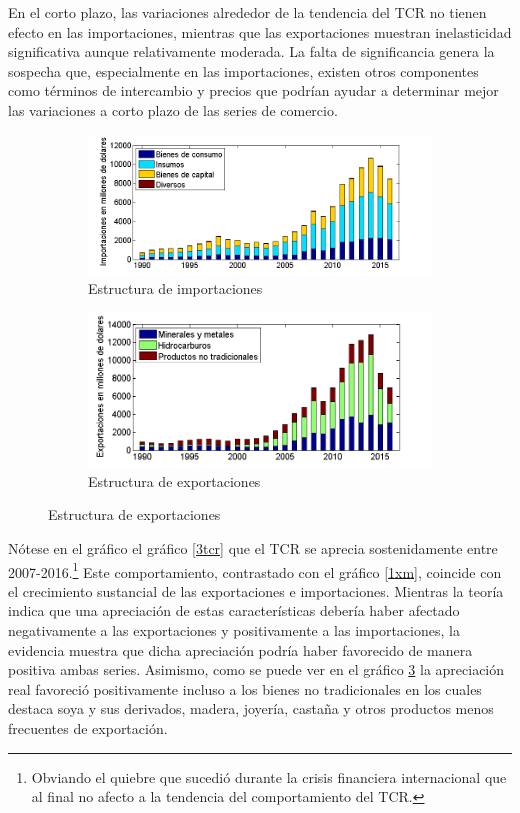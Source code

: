 \documentclass[12pt,letterpaper]{article}
\begin{document}
En el corto plazo, las variaciones alrededor de la tendencia del TCR no tienen efecto en las importaciones, mientras que las exportaciones muestran inelasticidad significativa aunque relativamente moderada. La falta de significancia genera la sospecha que, especialmente en las importaciones, existen otros componentes como términos de intercambio y precios que podrían ayudar a determinar mejor las variaciones a corto plazo de las series de comercio.

\begin{figure}
\captionsetup[subfigure]{aboveskip=-2pt,belowskip=-2pt}
\centering
\caption{Estructura de importaciones y exportaciones de Bolivia}\label{impexp}
    \begin{subfigure}[h]{0.65\textwidth}
        \includegraphics[width=\textwidth]{imp9016}
        \caption{Estructura de importaciones}
        \label{mestr}
    \end{subfigure}
    \begin{subfigure}[h]{0.65\textwidth}
        \includegraphics[width=\textwidth]{exp9016}
        \caption{Estructura de exportaciones}
        \label{xestr}
    \end{subfigure}
\end{figure}

Nótese en el gráfico el gráfico \ref{3tcr} que el TCR se aprecia sostenidamente entre 2007-2016.\footnote{Obviando el quiebre que sucedió durante la crisis financiera internacional que al final no afecto a la tendencia del comportamiento del TCR.} Este comportamiento, contrastado con el gráfico \ref{1xm}, coincide con el crecimiento sustancial de las exportaciones e importaciones. Mientras la teoría indica que una apreciación de estas características debería haber afectado negativamente a las exportaciones y positivamente a las importaciones, la evidencia muestra que dicha apreciación podría haber favorecido de manera positiva ambas series. Asimismo, como se puede ver en el gráfico \ref{xestr} la apreciación real favoreció positivamente incluso a los bienes no tradicionales en los cuales destaca soya y sus derivados, madera, joyería, castaña y otros productos menos frecuentes de exportación.
\end{document}
